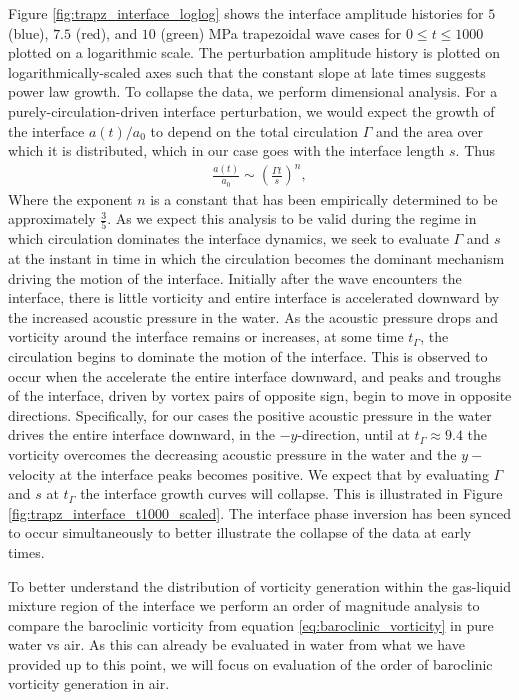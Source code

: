 \documentclass{article}
\begin{document}
Figure \ref{fig:trapz_interface_loglog} shows the interface
amplitude histories for $5$ (blue), $7.5$ (red), and $10$ (green) MPa
trapezoidal wave cases for $0 \leq t\leq 1000$ plotted on a
logarithmic scale. The perturbation amplitude history is plotted on
logarithmically-scaled axes such that the constant slope at late times
suggests power law growth. To collapse the data, we perform
dimensional analysis. For a purely-circulation-driven interface
perturbation, we would expect the growth of the interface $a(t)/a_0$
to depend on the total circulation $\Gamma$ and the area over which it
is distributed, which in our case goes with the interface length $s$. Thus
% 
\begin{align} \label{eq:intf_circ_scaling}
  \frac{a(t)}{a_0} \sim \left(\frac{\Gamma t}{s}\right)^n,
\end{align}
% 
Where the exponent $n$ is a constant that has been empirically
determined to be approximately $\frac{3}{5}$. As we expect this
analysis to be valid during the regime in which circulation dominates
the interface dynamics, we seek to evaluate $\Gamma$ and $s$ at the
instant in time in which the circulation becomes the dominant
mechanism driving the motion of the interface. Initially after the
wave encounters the interface, there is little vorticity and entire
interface is accelerated downward by the increased acoustic pressure
in the water. As the acoustic pressure drops and vorticity around the
interface remains or increases, at some time $t_\Gamma$, the
circulation begins to dominate the motion of the interface. This is
observed to occur when the accelerate the entire interface downward,
and peaks and troughs of the interface, driven by vortex pairs of
opposite sign, begin to move in opposite directions. Specifically, for
our cases the positive acoustic pressure in the water drives the
entire interface downward, in the $-y$-direction, until at
$t_\Gamma\approx9.4$ the vorticity overcomes the decreasing acoustic
pressure in the water and the $y-$velocity at the interface peaks
becomes positive. We expect that by evaluating $\Gamma$ and $s$ at
$t_\Gamma$ the interface growth curves will collapse. This is
illustrated in Figure \ref{fig:trapz_interface_t1000_scaled}. The
interface phase inversion has been synced to occur simultaneously to
better illustrate the collapse of the data at early times.


% 
% 
To better understand the distribution of vorticity generation within
the gas-liquid mixture region of the interface we perform an order of
magnitude analysis to compare the baroclinic vorticity from equation
\eqref{eq:baroclinic_vorticity} in pure water vs air. As this can
already be evaluated in water from what we have provided up to this
point, we will focus on evaluation of the order of baroclinic
vorticity generation in air.
\end{document}
